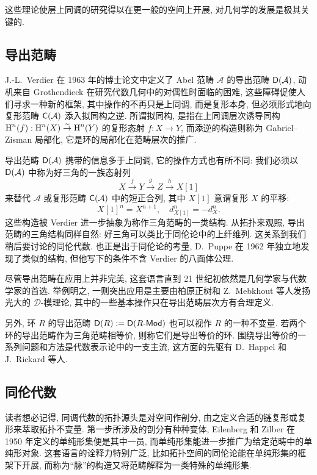 这些理论使层上同调的研究得以在更一般的空间上开展, 对几何学的发展是极其关键的.

\subsection*{导出范畴}
J.-L.\ Verdier 在 1963 年的博士论文中定义了 Abel 范畴 $\mathcal{A}$ 的导出范畴 $\mathsf{D}(\mathcal{A})$, 动机来自 Grothendieck 在研究代数几何中的对偶性时面临的困难, 这些障碍促使人们寻求一种新的框架, 其中操作的不再只是上同调, 而是复形本身, 但必须形式地向复形范畴 $\mathsf{C}(\mathcal{A})$ 添入拟同构之逆. 所谓拟同构, 是指在上同调层次诱导同构 $\operatorname{H}^n(f): \operatorname{H}^n(X) \stackrel{\sim}{\rightarrow} \operatorname{H}^n(Y)$ 的复形态射 $f: X \to Y$, 而添逆的构造则称为 Gabriel--Zisman 局部化, 它是环的局部化在范畴层次的推广.

导出范畴 $\mathsf{D}(\mathcal{A})$ 携带的信息多于上同调, 它的操作方式也有所不同: 我们必须以 $\mathsf{D}(\mathcal{A})$ 中称为好三角的一族态射列
\[ X \xrightarrow{f} Y \xrightarrow{g} Z \xrightarrow{h} X[1] \]
来替代 $\mathcal{A}$ 或复形范畴 $\mathsf{C}(\mathcal{A})$ 中的短正合列, 其中 $X[1]$ 意谓复形 $X$ 的平移:
\[ X[1]^n = X^{n+1}, \quad d_{X[1]}^n = -d_X^n. \]
这些构造被 Verdier 进一步抽象为称作三角范畴的一类结构. 从拓扑来观照, 导出范畴的三角结构同样自然: 好三角可以类比于同伦论中的上纤维列. 这关系到我们稍后要讨论的同伦代数. 也正是出于同伦论的考量, D.\ Puppe 在 1962 年独立地发现了类似的结构, 但他写下的条件不含 Verdier 的八面体公理.

尽管导出范畴在应用上并非完美, 这套语言直到 21 世纪初依然是几何学家与代数学家的首选. 举例明之, 一则突出应用是主要由柏原正树和 Z.\ Mebkhout 等人发扬光大的 $\mathscr{D}$-模理论, 其中的一些基本操作只在导出范畴层次方有合理定义.

另外, 环 $R$ 的导出范畴 $\mathsf{D}(R) := \mathsf{D}(R\text{-}\mathsf{Mod})$ 也可以视作 $R$ 的一种不变量. 若两个环的导出范畴作为三角范畴相等价, 则称它们是导出等价的环. 围绕导出等价的一系列问题和方法是代数表示论中的一支主流, 这方面的先驱有 D.\ Happel 和 J.\ Rickard 等人.

\subsection*{同伦代数}
读者想必记得, 同调代数的拓扑源头是对空间作剖分, 由之定义合适的链复形或复形来萃取拓扑不变量. 第一步所涉及的剖分有种种变体, Eilenberg 和 Zilber 在 1950 年定义的单纯形集便是其中一员, 而单纯形集能进一步推广为给定范畴中的单纯形对象. 这套语言的诠释力特别广泛, 比如拓扑空间的同伦论能在单纯形集的框架下开展, 而称为``脉''的构造又将范畴解释为一类特殊的单纯形集.

